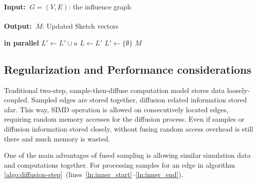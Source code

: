 \documentclass[10pt,journal,compsoc]{IEEEtran}
\renewcommand{\algorithmicrequire}{\textbf{Input:~}}
\renewcommand{\algorithmicensure}{\textbf{Output:~}}
\begin{document}
\begin{algorithm}[!ht]
\caption{($G,M,J,R_S$)}
\label{algo:diffusion-step}
\algorithmicrequire{$G = (V,E)$: the influence graph
\\
\\}
\algorithmicensure{$M$: Updated Sketch vectors
}
\begin{algorithmic}[1]
         {\bf in parallel} \label{ln:inner_start} %
            \For{$j \in (0,J]$}
                 \label{ln:early_exit}
                    \label{ln:update}         
                \EndIf
            \EndFor
                \State $L' \leftarrow L' \cup u $ \label{ln:inner_end}
            \EndIf
        \EndFor
        \EndFor
        \State $L \leftarrow L'$
        \State $L' \leftarrow \{\emptyset\}$
    \EndWhile
    \State \Return $M$
\end{algorithmic}
\end{algorithm}

\subsection{Regularization and Performance considerations}
Traditional two-step, sample-then-diffuse computation model stores data loosely-coupled. Sampled edges are stored together, diffusion related information stored afar. This way, SIMD operation is allowed on consecutively located edges, requiring random memory accesses for the diffusion process. Even if samples or diffusion information stored closely, without fusing random access overhead is still there and much memory is wasted. 

One of the main advantages of fused sampling is allowing similar simulation data and computations together. For processing samples for an edge in algorithm \ref{algo:diffusion-step}~(lines~\ref{ln:inner_start}--\ref{ln:inner_end}).  
\end{document}
